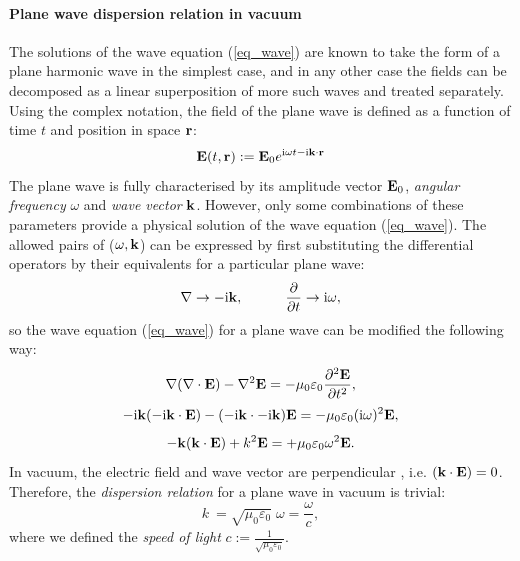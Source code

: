 \documentclass[letterpaper,12pt]{report}
\begin{document}
\paragraph{Plane wave dispersion relation in vacuum} The solutions of the wave equation (\ref{eq_wave}) are known to take the form of a plane harmonic wave in the simplest case, and in any other case the fields can be decomposed as a linear superposition of more such waves and treated separately. Using the complex notation, the field of the plane wave is defined as a function of time $t$ and position in space ${\mathbf{r}}$:%
\begin{equation} \mathbf{E}(t, {\mathbf{r}}) := \mathbf{E}_0 e^{{\mathrm i}\omega t - {\mathrm i}{\mathbf{k}}\cdot{\mathbf{r}}} \label{eq_pw}\end{equation}
The plane wave is fully characterised by its amplitude vector $\mathbf{E}_0$, \textit{angular frequency} $\omega$ and \textit{wave vector} ${\mathbf{k}}$. 
However, only some combinations of these parameters provide a physical solution of the wave equation (\ref{eq_wave}). The allowed pairs of ($\omega, {\mathbf{k}}$) can be expressed by first substituting the differential operators by their equivalents for a particular plane wave: %
\begin{equation} \nabla \rightarrow -{\mathrm i}{\mathbf{k}}, \quad\quad\quad 
\frac{\partial} {\partial t} \rightarrow {\mathrm i}\omega, \label{eq_difftok}\end{equation}
so the wave equation (\ref{eq_wave}) for a plane wave can be modified the following way:
$$					\nabla (\nabla \cdot \mathbf{E}) - \nabla^2 \mathbf{E}				  =	-\mu_0 \varepsilon_0 \frac{\partial^{2} \mathbf{E}}{\partial t^{2}},  $$
$$				 -{\mathrm i}{\mathbf{k}} (-{\mathrm i}{\mathbf{k}} \cdot \mathbf{E})  - (-{\mathrm i}{\mathbf{k}} \cdot -{\mathrm i}{\mathbf{k}}) \mathbf{E} = -\mu_0 \varepsilon_0 ({\mathrm i}\omega)^2 \mathbf{E}, $$
\begin{equation}   - {\mathbf{k}} ({\mathbf{k}} \cdot \mathbf{E})      +          k^2 \mathbf{E}            = +\mu_0 \varepsilon_0 \omega^{2} \mathbf{E}.  \label{eq_wavek}\end{equation}
In vacuum, the electric field and wave vector are perpendicular %
, i.e. $({\mathbf{k}} \cdot \mathbf{E}) = 0$. Therefore, the \textit{dispersion relation} for a plane wave in vacuum is trivial:
\begin{equation} k~= \sqrt{\mu_0 \varepsilon_0}\; \omega = \frac{\omega}{c}, \label{eq_dispeq_vac}\end{equation}
where we defined the \textit{speed of light} $c := \frac{1}{\sqrt{\mu_0 \varepsilon_0}}$.
\end{document}
